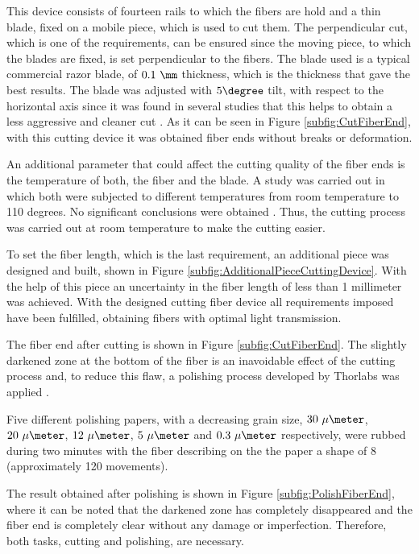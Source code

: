 This device consists of fourteen rails to which the fibers are hold and a thin blade, fixed on a mobile piece, which is used to cut them. The perpendicular cut, which is one of the requirements, can be ensured since the moving piece, to which the blades are fixed, is set perpendicular to the fibers. The blade used is a typical commercial razor blade, of $0.1~\mm$ thickness, which is the thickness that gave the best results. The blade was adjusted with $5\degree$ tilt, with respect to the horizontal axis since it was found in several studies that this helps to obtain a less aggressive and cleaner cut \cite{AngleBlade, TemperatureBlade}. As it can be seen in Figure \ref{subfig:CutFiberEnd}, with this cutting device it was obtained fiber ends without breaks or deformation.

An additional parameter that could affect the cutting quality of the fiber ends is the temperature of both, the fiber and the blade. A study was carried out in which both were subjected to different temperatures from room temperature to 110 degrees. No significant conclusions were obtained \cite{TFGAlberto}. Thus, the cutting process was carried out at room temperature to make the cutting easier.

To set the fiber length, which is the last requirement, an additional piece was designed and built, shown in Figure \ref{subfig:AdditionalPieceCuttingDevice}. With the help of this piece an uncertainty in the fiber length of less than 1 millimeter was achieved. With the designed cutting fiber device all requirements imposed have been fulfilled, obtaining fibers with optimal light transmission.

The fiber end after cutting is shown in Figure \ref{subfig:CutFiberEnd}. The slightly darkened zone at the bottom of the fiber is an inavoidable effect of the cutting process and, to reduce this flaw, a polishing process developed by Thorlabs was applied \cite{DiamondThorlabs}. 

Five different polishing papers, with a decreasing grain size, $30~\mu\meter$, $20~\mu\meter$, $12~\mu\meter$, $5~\mu\meter$ and $0.3~\mu\meter$ respectively, were rubbed during two minutes with the fiber describing on the the paper a shape of 8 (approximately 120 movements). 

The result obtained after polishing is shown in Figure \ref{subfig:PolishFiberEnd}, where it can be noted that the darkened zone has completely disappeared and the fiber end is completely clear without any damage or imperfection. Therefore, both tasks, cutting and polishing,  are necessary.

